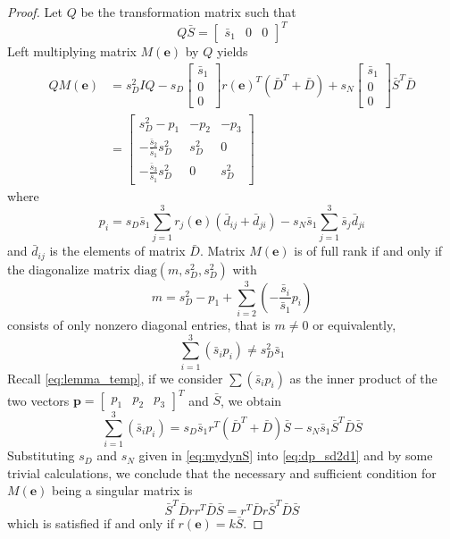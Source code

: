 \documentclass[times]{rncauth}
\begin{document}
\begin{proof}
Let $Q$ be the transformation matrix such that
$$Q\bar{S}=\begin{bmatrix} \bar{s}_1&0& 0
\end{bmatrix}^T$$
Left multiplying matrix $M(\mathbf{e})$ by $Q$ yields
\begin{align}
  QM(\mathbf{e})&=s_D^2IQ-s_D\begin{bmatrix}\bar{s}_1\\0\\0\end{bmatrix}
  r(\mathbf{e})^T(\bar{D}^T+\bar{D})+s_N\begin{bmatrix}\bar{s}_1\\0\\ 0\end{bmatrix}\bar{S}^T\bar{D}\nonumber\\
  &=\begin{bmatrix}
    s_D^2-p_1&-p_2&-p_3\\
    -\frac{\bar{s}_2}{\bar{s}_1}s_D^2&s_D^2&0\\
    -\frac{\bar{s}_3}{\bar{s}_1}s_D^2&0&s_D^2
  \end{bmatrix}\label{eq:lemma_temp}
\end{align}
where
$$p_i=s_D\bar{s}_1\sum_{j=1}^{3}r_j(\mathbf{e})(\bar{d}_{ij}+\bar{d}_{ji})-
s_N\bar{s}_1\sum_{j=1}^3\bar{s}_j\bar{d}_{ji}$$ and $\bar{d}_{ij}$
is the elements of matrix $\bar{D}$. Matrix $M(\mathbf{e})$ is of
full rank if and only if the diagonalize matrix
$\text{diag}(m,s^2_D,s^2_D)$ with
$$m=s_D^2-p_1+\sum_{i=2}^3(-\frac{\bar{s}_i}{\bar{s}_1}p_i)$$ consists of only
nonzero diagonal entries, that is $m\neq 0$ or equivalently,
\begin{equation}\label{eq:dp_sd2d1}
  \sum_{i=1}^3(\bar{s}_ip_i)\neq s_D^2\bar{s}_1
\end{equation}
Recall \eqref{eq:lemma_temp}, if we consider $\sum(\bar{s}_ip_i)$ as
the inner product of the two vectors $\mathbf{p}=\begin{bmatrix}p_1
&p_2&p_3\end{bmatrix}^T$ and $\bar{S}$, we obtain
\begin{equation}\label{eq:temp2}
  \sum_{i=1}^3(\bar{s}_ip_i)=s_D \bar{s}_1 r^T(\bar{D}^T+\bar{D}) \bar{S}-s_N \bar{s}_1 \bar{S}^T\bar{D}
  \bar{S}
\end{equation}
Substituting $s_D$ and $s_N$ given in \eqref{eq:mydynS}  into
\eqref{eq:dp_sd2d1} and by some trivial calculations, we conclude
that the necessary and sufficient condition for $M(\mathbf{e})$
being a singular matrix is
\begin{equation}\label{eq:judgeM}
\bar{S}^T\bar{D}rr^T\bar{D}\bar{S}=r^T\bar{D}r\bar{S}^T\bar{D}\bar{S}
\end{equation} which is
satisfied if and only if $r(\mathbf{e})=k\bar{S}$.
\end{proof}
\end{document}
